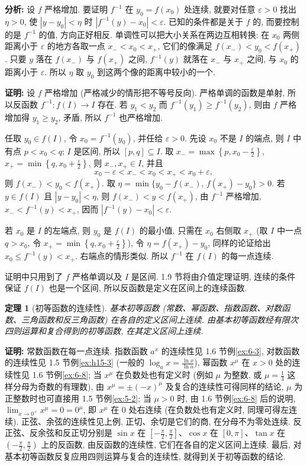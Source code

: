 \documentclass[UTF8,openany]{ctexbook}
\theoremstyle{chinesetextbook}
\newtheorem{theorem}{定理}[section]
\newenvironment{cnproof}{\par\indent\textbf{证明:} \ignorespaces}{\par}
\begin{document}
\par\indent\textbf{分析:} 设 $f$ 严格增加. 要证明 $f^{-1}$ 在 $y_0=f(x_0)$ 处连续, 就要对任意 $\varepsilon>0$ 找出 $\eta>0$, 使 $|y-y_0|<\eta$ 时 $|f^{-1}(y)-x_0|<\varepsilon$. 已知的条件都是关于 $f$ 的, 而要控制的是 $f^{-1}$ 的值, 方向正好相反. 单调性可以把大小关系在两边互相转换: 在 $x_0$ 两侧距离小于 $\varepsilon$ 的地方各取一点 $x_-<x_0<x_+$, 它们的像满足 $f(x_-)<y_0<f(x_+)$. 只要 $y$ 落在 $f(x_-)$ 与 $f(x_+)$ 之间, $f^{-1}(y)$ 就落在 $x_-$ 与 $x_+$ 之间, 与 $x_0$ 的距离小于 $\varepsilon$. 所以 $\eta$ 取 $y_0$ 到这两个像的距离中较小的一个.
\begin{cnproof}
设 $f$ 严格增加 (严格减少的情形把不等号反向). 严格单调的函数是单射, 所以反函数 $f^{-1}:f(I)\to I$ 存在. 若 $y_1<y_2$ 而 $f^{-1}(y_1)\ge f^{-1}(y_2)$, 则由 $f$ 严格增加得 $y_1\ge y_2$, 矛盾, 所以 $f^{-1}$ 也严格增加.

任取 $y_0\in f(I)$, 令 $x_0=f^{-1}(y_0)$, 并任给 $\varepsilon>0$. 先设 $x_0$ 不是 $I$ 的端点, 则 $I$ 中有点 $p<x_0<q$; $I$ 是区间, 所以 $[p,q]\subseteq I$. 取 $\displaystyle x_-=\max\left\{p,x_0-\frac\varepsilon2\right\}$, $\displaystyle x_+=\min\left\{q,x_0+\frac\varepsilon2\right\}$, 则 $x_-,x_+\in I$, 并且
\[
x_0-\varepsilon<x_-<x_0<x_+<x_0+\varepsilon,
\]
则 $f(x_-)<y_0<f(x_+)$. 取 $\eta=\min\{y_0-f(x_-),\,f(x_+)-y_0\}>0$. 若 $y\in f(I)$ 且 $|y-y_0|<\eta$, 则 $f(x_-)<y<f(x_+)$, 由 $f^{-1}$ 严格增加, $x_-<f^{-1}(y)<x_+$, 因而 $|f^{-1}(y)-x_0|<\varepsilon$.

若 $x_0$ 是 $I$ 的左端点, 则 $y_0$ 是 $f(I)$ 的最小值, 只需在 $x_0$ 右侧取 $x_+$ (取 $I$ 中一点 $q>x_0$, 令 $\displaystyle x_+=\min\left\{q,x_0+\frac\varepsilon2\right\}$), 令 $\eta=f(x_+)-y_0$, 同样的论证给出 $x_0\le f^{-1}(y)<x_+$. 右端点的情形类似. 所以 $f^{-1}$ 在 $f(I)$ 的每一点连续.
\end{cnproof}
证明中只用到了 $f$ 严格单调以及 $I$ 是区间. 1.9 节将由介值定理证明, 连续的条件保证 $f(I)$ 也是一个区间, 所以反函数是定义在区间上的连续函数.
\begin{theorem}[初等函数的连续性]
基本初等函数 (常数、幂函数、指数函数、对数函数、三角函数和反三角函数) 在各自的定义区间上连续. 由基本初等函数经有限次四则运算和复合得到的初等函数, 在其定义区间上连续.
\end{theorem}
\begin{cnproof}
常数函数在每一点连续. 指数函数 $a^x$ 的连续性见 1.6 节例\ref{ex:6-3}, 对数函数的连续性见 1.5 节例\ref{ex:h15-3} (一般的 $\displaystyle\log_ax=\frac{\ln x}{\ln a}$), 幂函数 $x^\mu$ 在 $x>0$ 处的连续性见 1.6 节例\ref{ex:6-8}; 当 $x^\mu$ 在负数处也有定义时 (例如 $\mu$ 为整数, 或 $\displaystyle\mu=\frac13$ 这样分母为奇数的有理数), 由 $x^\mu=\pm(-x)^\mu$ 及复合的连续性可得同样的结论, $\mu$ 为正整数时也可直接用 1.5 节例\ref{ex:5-2}; 当 $\mu>0$ 时, 由 1.6 节例\ref{ex:6-8} 后的说明, $\displaystyle\lim_{x\to0^+}x^\mu=0=0^\mu$, 即 $x^\mu$ 在 $0$ 处右连续 (在负数处也有定义时, 同理可得左连续). 正弦、余弦的连续性见上例, 正切、余切是它们的商, 在分母不为零处连续. 反正弦、反余弦和反正切分别是 $\sin x$ 在 $\displaystyle\left[-\frac\pi2,\frac\pi2\right]$、$\cos x$ 在 $[0,\pi]$、$\tan x$ 在 $\displaystyle\left(-\frac\pi2,\frac\pi2\right)$ 上的反函数, 由反函数的连续性, 它们在各自的定义区间上连续. 最后, 对基本初等函数反复应用四则运算与复合的连续性, 就得到关于初等函数的结论.
\end{cnproof}
\end{document}
